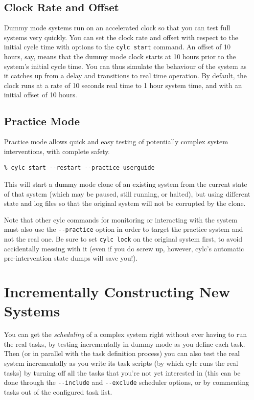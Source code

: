 \documentclass[11pt,a4paper]{article}
\begin{document}
\subsection{Clock Rate and Offset}

Dummy mode systems run on an accelerated clock so that you can test full
systems very quickly. You can set the clock rate and offset with respect
to the initial cycle time with options to the \lstinline=cylc start=
command. An offset of 10 hours, say, means that the dummy mode clock
starts at 10 hours prior to the system's initial cycle time.  You can
thus simulate the behaviour of the system as it catches up from a delay
and transitions to real time operation.  By default, the clock runs at a
rate of 10 seconds real time to 1 hour system time, and with an initial
offset of 10 hours. 

\subsection{Practice Mode}

Practice mode allows quick and easy testing of potentially complex
system interventions, with complete safety.

\begin{lstlisting}
% cylc start --restart --practice userguide
\end{lstlisting}

This will start a dummy mode clone of an existing system from the
current state of that system (which may be paused, still running, or
halted), but using different state and log files so that the original
system will not be corrupted by the clone.

Note that other cylc commands for monitoring or interacting with the
system must also use the \lstinline=--practice= option in order to
target the practice system and not the real one. Be sure to set
\lstinline=cylc lock= on the original system first, to avoid
accidentally messing with it (even if you do screw up, however, cylc's
automatic pre-intervention state dumps will save you!).


\section{Incrementally Constructing New Systems} 
\label{IncrementallyConstructingNewSystems}

You can get the {\em scheduling} of a complex system right without ever
having to run the real tasks, by testing incrementally in dummy mode as
you define each task. Then (or in parallel with the task definition
process) you can also test the real system incrementally as you write
its task scripts (by which cylc runs the real tasks) by turning off all
the tasks that you're not yet interested in (this can be done through
the \lstinline=--include= and \lstinline=--exclude= scheduler options,
or by commenting
tasks out of the configured task list.
\end{document}

